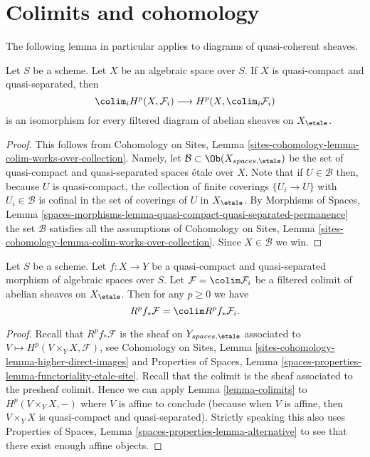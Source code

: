 \section{Colimits and cohomology}
\label{section-colimits}

\noindent
The following lemma in particular applies to diagrams of quasi-coherent
sheaves.

\begin{lemma}
\label{lemma-colimits}
Let $S$ be a scheme. Let $X$ be an algebraic space over $S$.
If $X$ is quasi-compact and quasi-separated, then
$$
\colim_i H^p(X, \mathcal{F}_i)
\longrightarrow
H^p(X, \colim_i \mathcal{F}_i)
$$
is an isomorphism
for every filtered diagram of abelian sheaves on $X_\etale$.
\end{lemma}

\begin{proof}
This follows from
Cohomology on Sites, Lemma
\ref{sites-cohomology-lemma-colim-works-over-collection}.
Namely, let $\mathcal{B} \subset \Ob(X_{spaces, \etale})$
be the set of quasi-compact and quasi-separated spaces \'etale over $X$.
Note that if $U \in \mathcal{B}$ then, because $U$ is quasi-compact,
the collection of finite coverings $\{U_i \to U\}$ with $U_i \in \mathcal{B}$
is cofinal in the set of coverings of $U$ in $X_\etale$. By
Morphisms of Spaces, Lemma
\ref{spaces-morphisms-lemma-quasi-compact-quasi-separated-permanence}
the set $\mathcal{B}$ satisfies all the assumptions of
Cohomology on Sites, Lemma
\ref{sites-cohomology-lemma-colim-works-over-collection}.
Since $X \in \mathcal{B}$ we win.
\end{proof}

\begin{lemma}
\label{lemma-colimit-cohomology}
Let $S$ be a scheme. Let $f : X \to Y$ be a quasi-compact and quasi-separated
morphism of algebraic spaces over $S$. Let $\mathcal{F} = \colim \mathcal{F}_i$
be a filtered colimit of abelian sheaves on $X_\etale$.
Then for any $p \geq 0$ we have
$$
R^pf_*\mathcal{F} = \colim R^pf_*\mathcal{F}_i.
$$
\end{lemma}

\begin{proof}
Recall that $R^pf_*\mathcal{F}$ is the sheaf on $Y_{spaces, \etale}$
associated to $V \mapsto H^p(V \times_Y X, \mathcal{F})$, see
Cohomology on Sites, Lemma \ref{sites-cohomology-lemma-higher-direct-images}
and Properties of Spaces, Lemma
\ref{spaces-properties-lemma-functoriality-etale-site}.
Recall that the colimit is the sheaf associated to the presheaf colimit.
Hence we can apply Lemma \ref{lemma-colimits}
to $H^p(V \times_Y X, -)$ where $V$ is affine to conclude (because
when $V$ is affine, then $V \times_Y X$ is quasi-compact and quasi-separated).
Strictly speaking this also uses Properties of Spaces,
Lemma \ref{spaces-properties-lemma-alternative} to see that there exist
enough affine objects.
\end{proof}

